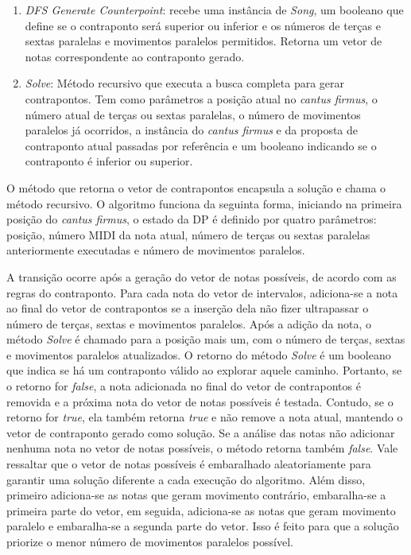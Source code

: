       \begin{enumerate}
        \item \textit{DFS Generate Counterpoint}: recebe uma instância de \textit{Song}, um booleano que define se o contraponto será superior ou inferior e os números de terças e sextas paralelas e movimentos paralelos permitidos. Retorna um vetor de notas correspondente ao contraponto gerado.
        \item \textit{Solve}: Método recursivo que executa a busca completa para gerar contrapontos. Tem como parâmetros a posição atual no \textit{cantus firmus}, o número atual de terças ou sextas paralelas, o número de movimentos paralelos já ocorridos, a instância do \textit{cantus firmus} e da proposta de contraponto atual passadas por referência e um booleano indicando se o contraponto é inferior ou superior.
      \end{enumerate}

      O método que retorna o vetor de contrapontos encapsula a solução e chama o método recursivo. O algoritmo funciona da seguinta forma, iniciando na primeira posição do \textit{cantus firmus}, o estado da DP é definido por quatro parâmetros: posição, número MIDI da nota atual, número de terças ou sextas paralelas anteriormente executadas e número de movimentos paralelos.

      A transição ocorre após a geração do vetor de notas possíveis, de acordo com as regras do contraponto. Para cada nota do vetor de intervalos, adiciona-se a nota ao final do vetor de contrapontos se a inserção dela não fizer ultrapassar o número de terças, sextas e movimentos paralelos. Após a adição da nota, o método \textit{Solve} é chamado para a posição mais um, com o número de terças, sextas e movimentos paralelos atualizados. O retorno do método \textit{Solve} é um booleano que indica se há um contraponto válido ao explorar aquele caminho. Portanto, se o retorno for \textit{false}, a nota adicionada no final do vetor de contrapontos é removida e a próxima nota do vetor de notas possíveis é testada. Contudo, se o retorno for \textit{true}, ela também retorna \textit{true} e não remove a nota atual, mantendo o vetor de contraponto gerado como solução. Se a análise das notas não adicionar nenhuma nota no vetor de notas possíveis, o método retorna também \textit{false}. Vale ressaltar que o vetor de notas possíveis é embaralhado aleatoriamente para garantir uma solução diferente a cada execução do algoritmo. Além disso, primeiro adiciona-se as notas que geram movimento contrário, embaralha-se a primeira parte do vetor, em seguida, adiciona-se as notas que geram movimento paralelo e embaralha-se a segunda parte do vetor. Isso é feito para que a solução priorize o menor número de movimentos paralelos possível.

